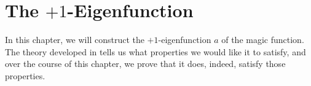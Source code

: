 \chapter{The $+1$-Eigenfunction}

In this chapter, we will construct the $+1$-eigenfunction $a$ of the magic function. The theory developed in  tells us what properties we would like it to satisfy, and over the course of this chapter, we prove that it does, indeed, satisfy those properties.


